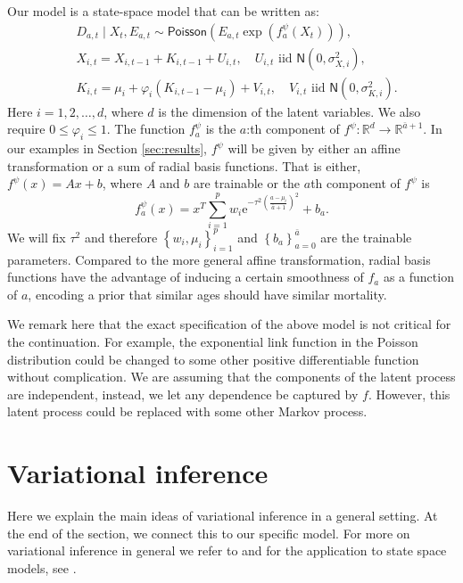 \documentclass[11pt]{article}
\newcommand{\cur}[1]{\left\{#1\right\}}
\newcommand{\pa}[1]{\left(#1\right)}
\def\ee{\ensuremath{\mathrm{e}}}
\begin{document}
Our model is a state-space model that can be written as:
\begin{align}
    & D_{a,t}\mid X_t,E_{a,t} \sim  \mathsf{Poisson}\pa{E_{a,t}\exp\pa{f^\psi_{a}(X_t)}},\label{eq:deathDist}\\
    & X_{i,t} =X_{i,t-1} + K_{i,t-1} + U_{i,t},\quad U_{i,t} \text{ iid }  \mathsf{N}(0,\sigma^2_{X,i}),\label{eq:state_level}\\
    & K_{i,t} = \mu_i + \varphi_i(K_{i,t-1} - \mu_i) + V_{i,t},\quad V_{i,t} \text{ iid }   \mathsf{N}(0,\sigma^2_{K,i}).\label{eq:state_trend}
\end{align}
Here $i=1,2,\ldots , d$, where $d$ is the dimension of the latent variables. We also require $0\leq \varphi_i \leq 1$. The function $f^\psi_a$ is the $a$:th component of $f^\psi:\mathbb R^d \to \mathbb R^{\bar a+1}$. In our examples in Section \ref{sec:results}, $f^\psi$ will be given by either an affine transformation or a sum of radial basis functions. That is either, $f^\psi(x) = Ax + b$, where $A$ and $b$ are trainable or the $a$th component of $f^\psi$ is
$$
f^\psi_a(x) = x^T\sum_{i=1}^p w_i \ee^{-\tau^2(\frac{a-\mu_i}{\bar a +1})^2} + b_a.
$$
We will fix $\tau^2$ and therefore $\cur{w_i ,\mu_i}_{i=1}^p$ and $\cur{b_a}_{a=0}^{\bar a}$ are the trainable parameters. Compared to the more general affine transformation, radial basis functions have the advantage of inducing a certain smoothness of $f_a$ as a function of $a$, encoding a prior that similar ages should have similar mortality.

We remark here that the exact specification of the above model is not critical for the continuation. For example, the exponential link function in the Poisson distribution could be changed to some other positive differentiable function without complication. We are assuming that the components of the latent process are independent, instead, we let any dependence be captured by $f$. However, this latent process could be replaced with some other Markov process.

\section{Variational inference}\label{sec:vi}
Here we explain the main ideas of variational inference in a general setting. At the end of the section, we connect this to our specific model. For more on variational inference in general we refer to \cite{ranganath2014black} and for the application to state space models, see \cite{archer2015black}.
    
\end{document}
